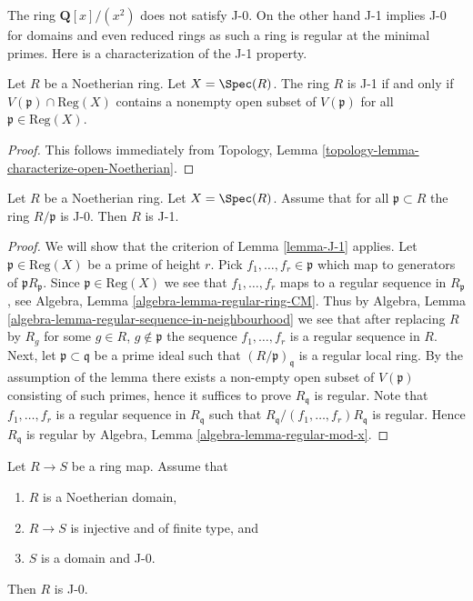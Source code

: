 \noindent
The ring $\mathbf{Q}[x]/(x^2)$ does not satisfy J-0. On the other
hand J-1 implies J-0 for domains and even reduced rings as such
a ring is regular at the minimal primes.
Here is a characterization of the J-1 property.

\begin{lemma}
\label{lemma-J-1}
Let $R$ be a Noetherian ring. Let $X = \Spec(R)$.
The ring $R$ is J-1 if and only if $V(\mathfrak p) \cap \text{Reg}(X)$
contains a nonempty open subset of $V(\mathfrak p)$ for all
$\mathfrak p \in \text{Reg}(X)$.
\end{lemma}

\begin{proof}
This follows immediately from
Topology, Lemma \ref{topology-lemma-characterize-open-Noetherian}.
\end{proof}

\begin{lemma}
\label{lemma-intersection-regular-with-closed}
Let $R$ be a Noetherian ring. Let $X = \Spec(R)$. Assume that for all
$\mathfrak p \subset R$ the ring $R/\mathfrak p$ is J-0.
Then $R$ is J-1.
\end{lemma}

\begin{proof}
We will show that the criterion of Lemma \ref{lemma-J-1} applies.
Let $\mathfrak p \in \text{Reg}(X)$ be a prime of height $r$.
Pick $f_1, \ldots, f_r \in \mathfrak p$ which map to generators
of $\mathfrak pR_\mathfrak p$. Since $\mathfrak p \in \text{Reg}(X)$
we see that $f_1, \ldots, f_r$ maps to a regular sequence in $R_\mathfrak p$,
see Algebra, Lemma \ref{algebra-lemma-regular-ring-CM}. Thus by
Algebra, Lemma \ref{algebra-lemma-regular-sequence-in-neighbourhood}
we see that after replacing $R$ by $R_g$ for some $g \in R$,
$g \not \in \mathfrak p$ the sequence $f_1, \ldots, f_r$ is a
regular sequence in $R$. Next, let $\mathfrak p \subset \mathfrak q$
be a prime ideal such that $(R/\mathfrak p)_\mathfrak q$ is
a regular local ring. By the assumption of the lemma there
exists a non-empty open subset of $V(\mathfrak p)$ consisting
of such primes, hence it suffices to prove $R_\mathfrak q$ is regular.
Note that $f_1, \ldots, f_r$ is a regular sequence in $R_\mathfrak q$
such that $R_\mathfrak q/(f_1, \ldots, f_r)R_\mathfrak q$ is regular.
Hence $R_\mathfrak q$ is regular by
Algebra, Lemma \ref{algebra-lemma-regular-mod-x}.
\end{proof}

\begin{lemma}
\label{lemma-J-0-goes-down}
Let $R \to S$ be a ring map. Assume that
\begin{enumerate}
\item $R$ is a Noetherian domain,
\item $R \to S$ is injective and of finite type, and
\item $S$ is a domain and J-0.
\end{enumerate}
Then $R$ is J-0.
\end{lemma}

